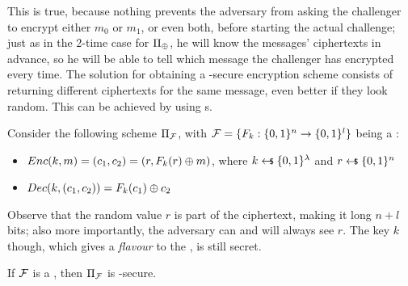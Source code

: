 This is true, because nothing prevents the adversary from asking the challenger to encrypt either $m_0$ or $m_1$, or even both, before starting the actual challenge; just as in the 2-time case for $\Pi_{\oplus}$, he will know the messages' ciphertexts in advance, so he will be able to tell which message the challenger has encrypted every time. The solution for obtaining a \cpa-secure encryption scheme consists of returning different ciphertexts for the same message, even better if they look random. This can be achieved by using \prf{}s.

Consider the following \ske{} scheme $\Pi_{\mathcal{F}}$, with $\mathcal{F}=\{ F_{k}:\{0,1\}^{n} \to \{0,1\}^{l} \}$ being a \prf:

\begin{itemize}
    \item $Enc(k, m) = (c_1, c_2) = (r, F_k(r) \oplus m)$, where $k \pickUAR \{0,1\}^\lambda$ and $r \pickUAR \{0,1\}^n$
    
    \item $Dec(k, (c_{1}, c_{2}))=F_{k}(c_{1}) \oplus c_{2}$
\end{itemize}

Observe that the random value $r$ is part of the ciphertext, making it long $n+l$ bits; also more importantly, the adversary can and will always see $r$. The key $k$ though, which gives a \textit{flavour} to the \prf, is still secret.

\begin{theorem}
    If $\mathcal{F}$ is a \prf, then $\Pi_{\mathcal{F}}$ is \cpa-secure.
\end{theorem}


